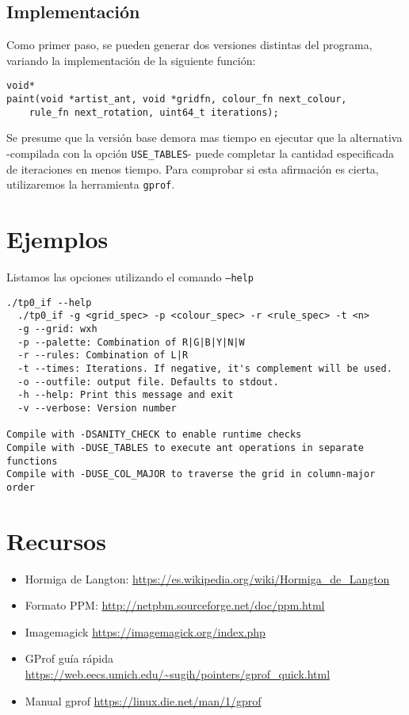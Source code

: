 \documentclass{article}
\begin{document}
\subsection{Implementación}

Como primer paso, se pueden generar dos versiones distintas del programa, variando la implementación de la siguiente
función:
\begin{small}
\begin{verbatim}
void*
paint(void *artist_ant, void *gridfn, colour_fn next_colour, 
    rule_fn next_rotation, uint64_t iterations);
\end{verbatim}
\end{small}

Se presume que la versión base demora mas tiempo en ejecutar que la alternativa -compilada con la opción 
\texttt{USE\_TABLES}- puede completar la cantidad especificada de iteraciones en menos tiempo.  Para comprobar si esta 
afirmación es cierta, utilizaremos la herramienta \texttt{gprof}.

\pagebreak
\section{Ejemplos}

Listamos las opciones utilizando el comando \texttt{--help}
\begin{verbatim}
./tp0_if --help
  ./tp0_if -g <grid_spec> -p <colour_spec> -r <rule_spec> -t <n>
  -g --grid: wxh
  -p --palette: Combination of R|G|B|Y|N|W
  -r --rules: Combination of L|R
  -t --times: Iterations. If negative, it's complement will be used.
  -o --outfile: output file. Defaults to stdout.
  -h --help: Print this message and exit
  -v --verbose: Version number

Compile with -DSANITY_CHECK to enable runtime checks
Compile with -DUSE_TABLES to execute ant operations in separate functions
Compile with -DUSE_COL_MAJOR to traverse the grid in column-major order
\end{verbatim}
\section{Recursos}\label{Recursos}

\begin{itemize}
\item Hormiga de Langton: \url{https://es.wikipedia.org/wiki/Hormiga_de_Langton}
\item Formato PPM: \url{http://netpbm.sourceforge.net/doc/ppm.html}
\item Imagemagick \url{https://imagemagick.org/index.php}
\item GProf guía rápida \url{https://web.eecs.umich.edu/~sugih/pointers/gprof_quick.html}
\item Manual gprof \url{https://linux.die.net/man/1/gprof}

\end{itemize}
\end{document}
